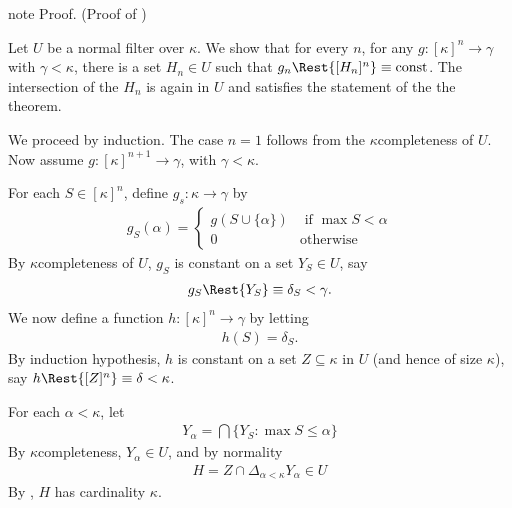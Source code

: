 \documentclass[letterpaper,10pt,english]{jupyterBook}
\begin{document}
\begin{sphinxadmonition}{note}
\sphinxAtStartPar
Proof. (Proof of {\hyperref[\detokenize{large_cardinals:thm-measurable-Ramsey}]{}})

\sphinxAtStartPar
Let \(U\) be a normal filter over \(\kappa\).
We show that for every \(n\), for any \(g: [\kappa]^n \to \gamma\) with \(\gamma < \kappa\), there is a set \(H_n \in U\) such that \(g_n \Rest{[H_n]^n} \equiv \text{const}\). The intersection of the \(H_n\) is again in \(U\) and satisfies the statement of the the theorem.

\sphinxAtStartPar
We proceed by induction. The case \(n=1\) follows from the \(\kappa\)\sphinxhyphen{}completeness of \(U\). Now assume \(g:[\kappa]^{n+1} \to \gamma\), with \(\gamma < \kappa\).

\sphinxAtStartPar
For each \(S \in [\kappa]^n\), define \(g_s : \kappa \to \gamma\) by
\begin{equation*}
\begin{split}
    g_S(\alpha) = \begin{cases}
        g(S \cup \{\alpha\}) & \text{ if } \max S < \alpha \\
        0 & \text{otherwise}
    \end{cases}
\end{split}
\end{equation*}
\sphinxAtStartPar
By \(\kappa\)\sphinxhyphen{}completeness of \(U\), \(g_S\) is constant on a set \(Y_S \in U\), say
\begin{equation*}
\begin{split}
    g_S\Rest{Y_S} \equiv \delta_S < \gamma.
\end{split}
\end{equation*}
\sphinxAtStartPar
We now define a function \(h: [\kappa]^n \to \gamma\)
by letting
\begin{equation*}
\begin{split}
    h(S) = \delta_S.
\end{split}
\end{equation*}
\sphinxAtStartPar
By induction hypothesis, \(h\) is constant on a set \(Z \subseteq \kappa\)
in \(U\) (and hence of size \(\kappa\)), say \(h\Rest{[Z]^n} \equiv \delta < \kappa\).

\sphinxAtStartPar
For each \(\alpha < \kappa\), let
\begin{equation*}
\begin{split}
    Y_\alpha = \bigcap \{Y_S \colon \max S \leq \alpha\}
\end{split}
\end{equation*}
\sphinxAtStartPar
By \(\kappa\)\sphinxhyphen{}completeness, \(Y_\alpha \in U\), and by normality
\begin{equation*}
\begin{split}
    H = Z \cap \Delta_{\alpha < \kappa} Y_\alpha \in U
\end{split}
\end{equation*}
\sphinxAtStartPar
By {\hyperref[\detokenize{large_cardinals:lem-cardinality-kappa-ultrafilter}]{}}, \(H\) has cardinality \(\kappa\).


\end{sphinxadmonition}
\end{document}
